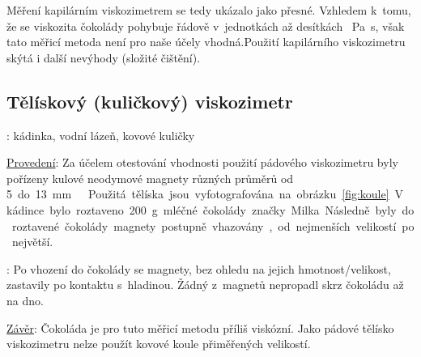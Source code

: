 \documentclass[12pt]{article}
\begin{document}
\par
Měření kapilárním viskozimetrem se tedy ukázalo jako přesné. Vzhledem k~tomu, že se viskozita čokolády pohybuje řádově v~jednotkách až desítkách \SI{}{\pascal\second}, však tato měřicí metoda není pro naše účely vhodná.\footnotemark\space Použití kapilárního viskozimetru skýtá i další nevýhody (složité čištění).

\subsection{Tělískový (kuličkový) viskozimetr}%

\noindent \underline{}: kádinka, vodní lázeň, kovové kuličky
\par
\noindent \underline{Provedení}: Za účelem otestování vhodnosti použití pádového viskozimetru byly pořízeny kulové neodymové magnety různých průměrů od \SI{5} do \SI{13}{\milli\metre}.\footnotemark\space Použitá tělíska jsou vyfotografována na obrázku \ref{fig:koule}. V~kádince bylo roztaveno \SI{200}{\gram} mléčné čokolády značky Milka. Následně byly do roztavené čokolády magnety postupně vhazovány, od nejmenších velikostí po největší.
\par
\underline{}: Po vhození do čokolády se magnety, bez ohledu na jejich hmotnost/velikost, zastavily po kontaktu s~hladinou. Žádný z~magnetů nepropadl skrz čokoládu až na dno.
\par
\underline{Závěr}: Čokoláda je pro tuto měřicí metodu příliš viskózní. Jako pádové tělísko viskozimetru nelze použít kovové koule přiměřených velikostí.
\end{document}
